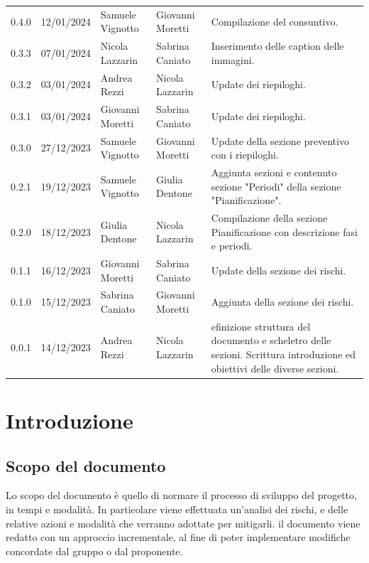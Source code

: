 \documentclass{article}
\begin{document}
\begin{center}
\begin{tabular}{P{5em} P{6em} P{8em} P{8em} P{10em}}
     0.4.0 & 12/01/2024 & Samuele Vignotto & Giovanni Moretti & Compilazione del consuntivo.\\
     0.3.3 & 07/01/2024 & Nicola Lazzarin & Sabrina Caniato & Inserimento delle caption delle immagini.\\
     0.3.2 & 03/01/2024 & Andrea Rezzi & Nicola Lazzarin & Update dei riepiloghi.\\ 
    0.3.1 & 03/01/2024 & Giovanni Moretti & Sabrina Caniato & Update dei riepiloghi.\\
     0.3.0 & 27/12/2023 & Samuele Vignotto & Giovanni Moretti & Update della sezione preventivo con i riepiloghi.\\ 
     0.2.1 & 19/12/2023 & Samuele Vignotto & Giulia Dentone & Aggiunta sezioni e contenuto sezione "Periodi" della sezione "Pianificazione".\\
     0.2.0 & 18/12/2023 & Giulia Dentone & Nicola Lazzarin & Compilazione della sezione Pianificazione con descrizione fasi e periodi.\\
     0.1.1 & 16/12/2023 & Giovanni Moretti & Sabrina Caniato & Update della sezione dei rischi.\\

    0.1.0 & 15/12/2023 & Sabrina Caniato & Giovanni Moretti & Aggiunta della sezione dei rischi.\\
     0.0.1 & 14/12/2023 & Andrea Rezzi & Nicola Lazzarin & efinizione struttura del documento e scheletro delle sezioni. Scrittura introduzione ed obiettivi delle diverse sezioni.\\ 
\end{tabular}
\end{center}
\newpage
\tableofcontents
\listoffigures
\listoftables
\newpage
\section{Introduzione}
\subsection{Scopo del documento}
Lo scopo del documento è quello di normare il processo di sviluppo del progetto, in tempi e modalità. In particolare viene effettuata un'analisi dei rischi, e delle relative azioni e modalità che verranno adottate per mitigarli. il documento viene redatto con un approccio incrementale, al fine di poter implementare modifiche concordate dal gruppo o dal proponente.
\end{document}
